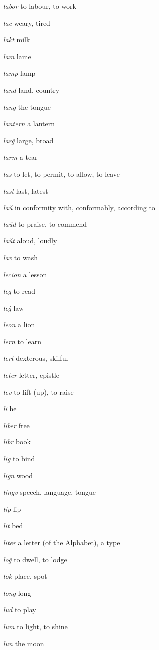 \begin{landscape}
\begin{multicols}{5}
\begin{outdent}{1em}
\emph{labor}  to labour, to work

\emph{lac}  weary, tired

\emph{lakt } milk

\emph{lam } lame

\emph{lamp}  lamp

\emph{land}  land, country

\emph{lang}  the tongue

\emph{lantern}  a lantern

\emph{larĝ}  large, broad

\emph{larm } a tear

\emph{las}  to let, to permit, to allow, to leave

\emph{last}  last, latest

\emph{laŭ}  in conformity with, conformably, according to

\emph{laŭd}  to praise, to commend

\emph{laŭt}  aloud, loudly

\emph{lav}  to wash

\emph{lecion}  a lesson

\emph{leg}  to read

\emph{leĝ}  law

\emph{leon}  a lion

\emph{lern}  to learn

\emph{lert}  dexterous, skilful

\emph{leter}  letter, epistle

\emph{lev } to lift (up), to raise

\emph{li } he

\emph{liber}  free

\emph{libr}  book

\emph{lig}  to bind

\emph{lign}  wood

\emph{lingv}  speech, language, tongue

\emph{lip}  lip

\emph{lit } bed

\emph{liter } a letter (of the Alphabet), a type

\emph{loĝ}  to dwell, to lodge

\emph{lok}  place, spot

\emph{long}  long

\emph{lud}  to play

\emph{lum } to light, to shine

\emph{lun}  the moon


\end{outdent}
\end{multicols}
\end{landscape}
